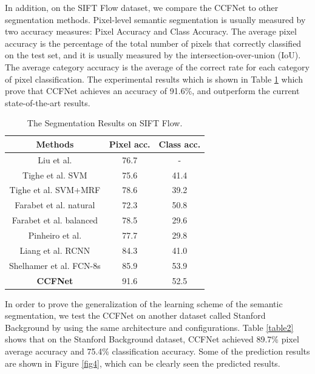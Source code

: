 \documentclass[10.5pt,compsoc]{TsT}
\newcommand{\upcite}[1]{\superscript{\textsuperscript{\cite{#1}}}}
\theoremstyle{mystyle}
\newcommand{\upcite}[1]{\textsuperscript{\cite{#1}}}
\begin{document}
{In addition, on the SIFT Flow dataset, we compare the CCFNet to other segmentation methods. Pixel-level semantic segmentation is usually measured by two accuracy measures: Pixel Accuracy and Class Accuracy. The average pixel accuracy is the percentage of the total number of pixels that correctly classified on the test set, and it is usually measured by the intersection-over-union (IoU). The average category accuracy is the average of the correct rate for each category of pixel classification. The experimental results which is shown in Table \ref{table1} which prove that CCFNet achieves an accuracy of 91.6\%, and outperform the current state-of-the-art results.

\begin{table}[h]
\large
\setlength{\belowcaptionskip}{12pt}
\caption{The Segmentation Results on SIFT Flow.}
\label{table1}
\centering
\begin{tabular}{ccc}
\hline 
Methods & Pixel acc. & Class acc. \\
\hline
Liu et al.\upcite{8} & 76.7 & - \\
Tighe et al. SVM\upcite{25} & 75.6 & 41.4 \\
Tighe et al. SVM+MRF\upcite{26} & 78.6 & 39.2 \\
Farabet et al. natural\upcite{26} & 72.3 & 50.8 \\
Farabet et al. balanced\upcite{13} & 78.5 & 29.6 \\
Pinheiro et al.\upcite{13} & 77.7 & 29.8 \\
Liang et al. RCNN\upcite{15} & 84.3 & 41.0 \\
Shelhamer et al. FCN-8s\upcite{21} & 85.9 & 53.9 \\
\textbf{CCFNet} & 91.6 & 52.5 \\

\hline
\end{tabular}
\end{table}

In order to prove the generalization of the learning scheme of the semantic segmentation, we test the CCFNet on another dataset called Stanford Background by using the same architecture and configurations. Table \ref{table2} shows that on the Stanford Background dataset, CCFNet achieved 89.7\% pixel average accuracy and 75.4\% classification accuracy. Some of the prediction results are shown in Figure \ref{fig4}, which can be clearly seen the predicted results.

}
\end{document}
